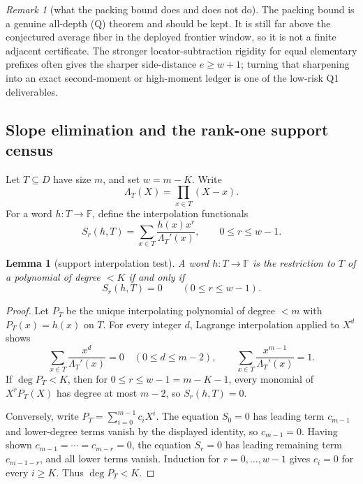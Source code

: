 \documentclass[11pt]{article}
\newtheorem{lemma}[lemma]{Lemma}
\theoremstyle{definition}
\theoremstyle{remark}
\newtheorem{remark}[remark]{Remark}
\newcommand{\F}{\mathbb{F}}
\begin{document}
\begin{remark}[what the packing bound does and does not do]\label{rem:capfr1-packing-gap}
The packing bound is a genuine all-depth \textup{(Q)} theorem and should be kept.  It is still far above the conjectured average fiber in the deployed frontier window, so it is not a finite adjacent certificate.  The stronger locator-subtraction rigidity for equal elementary prefixes often gives the sharper side-distance \(e\ge w+1\); turning that sharpening into an exact second-moment or high-moment ledger is one of the low-risk Q1 deliverables.
\end{remark}

\subsection{Slope elimination and the rank-one support census}\label{subsec:capfr1-slope-elimination}

Let \(T\subseteq D\) have size \(m\), and set \(w=m-K\).  Write
\[
        \Lambda_T(X)=\prod_{x\in T}(X-x).
\]
For a word \(h:T\to\F\), define the interpolation functionals
\[
        S_r(h,T)=\sum_{x\in T}\frac{h(x)x^r}{\Lambda_T'(x)},
        \qquad 0\le r\le w-1.
\]

\begin{lemma}[support interpolation test]\label{lem:capfr1-interpolation-test}
A word \(h:T\to\F\) is the restriction to \(T\) of a polynomial of degree \(<K\) if and only if
\[
        S_r(h,T)=0\qquad(0\le r\le w-1).
\]
\end{lemma}

\begin{proof}
Let \(P_T\) be the unique interpolating polynomial of degree \(<m\) with \(P_T(x)=h(x)\) on \(T\).  For every integer \(d\), Lagrange interpolation applied to \(X^d\) shows
\[
        \sum_{x\in T}\frac{x^d}{\Lambda_T'(x)}=0\quad(0\le d\le m-2),
        \qquad
        \sum_{x\in T}\frac{x^{m-1}}{\Lambda_T'(x)}=1.
\]
If \(\deg P_T<K\), then for \(0\le r\le w-1=m-K-1\), every monomial of \(X^rP_T(X)\) has degree at most \(m-2\), so \(S_r(h,T)=0\).

Conversely, write \(P_T=\sum_{i=0}^{m-1}c_iX^i\).  The equation \(S_0=0\) has leading term \(c_{m-1}\) and lower-degree terms vanish by the displayed identity, so \(c_{m-1}=0\).  Having shown \(c_{m-1}=\cdots=c_{m-r}=0\), the equation \(S_r=0\) has leading remaining term \(c_{m-1-r}\), and all lower terms vanish.  Induction for \(r=0,\ldots,w-1\) gives \(c_i=0\) for every \(i\ge K\).  Thus \(\deg P_T<K\).
\end{proof}
\end{document}
